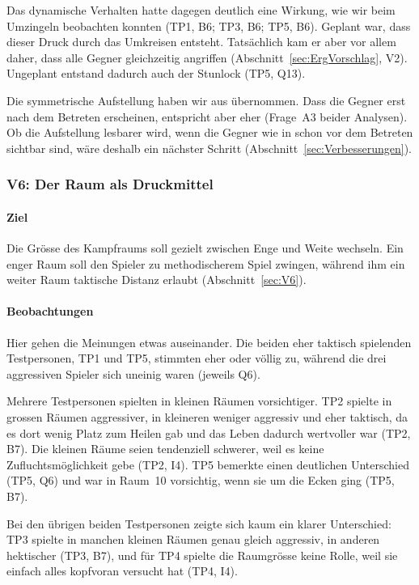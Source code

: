 \documentclass[../Main.tex]{subfiles}
\begin{document}
Das dynamische Verhalten hatte dagegen deutlich eine Wirkung, wie wir beim Umzingeln beobachten konnten (TP1, B6; TP3, B6; TP5, B6). Geplant war, dass dieser Druck durch das Umkreisen entsteht. Tatsächlich kam er aber vor allem daher, dass alle Gegner gleichzeitig angriffen (Abschnitt~\ref{sec:ErgVorschlag}, V2). Ungeplant entstand dadurch auch der Stunlock (TP5, Q13).

Die symmetrische Aufstellung haben wir aus  übernommen. Dass die Gegner erst nach dem Betreten erscheinen, entspricht aber eher  (Frage~A3 beider Analysen). Ob die Aufstellung lesbarer wird, wenn die Gegner wie in  schon vor dem Betreten sichtbar sind, wäre deshalb ein nächster Schritt (Abschnitt~\ref{sec:Verbesserungen}).

\subsubsection{V6: Der Raum als Druckmittel}

\paragraph{Ziel}
Die Grösse des Kampfraums soll gezielt zwischen Enge und Weite wechseln. Ein enger Raum soll den Spieler zu methodischerem Spiel zwingen, während ihm ein weiter Raum taktische Distanz erlaubt (Abschnitt~\ref{sec:V6}).

\paragraph{Beobachtungen}
Hier gehen die Meinungen etwas auseinander. Die beiden eher taktisch spielenden Testpersonen, TP1 und TP5, stimmten eher oder völlig zu, während die drei aggressiven Spieler sich uneinig waren (jeweils Q6).

Mehrere Testpersonen spielten in kleinen Räumen vorsichtiger. TP2 spielte in grossen Räumen aggressiver, in kleineren weniger aggressiv und eher taktisch, da es dort wenig Platz zum Heilen gab und das Leben dadurch wertvoller war (TP2, B7). Die kleinen Räume seien tendenziell schwerer, weil es keine Zufluchtsmöglichkeit gebe (TP2, I4). TP5 bemerkte einen deutlichen Unterschied (TP5, Q6) und war in Raum~10 vorsichtig, wenn sie um die Ecken ging (TP5, B7).

Bei den übrigen beiden Testpersonen zeigte sich kaum ein klarer Unterschied: TP3 spielte in manchen kleinen Räumen genau gleich aggressiv, in anderen hektischer (TP3, B7), und für TP4 spielte die Raumgrösse keine Rolle, weil sie einfach alles kopfvoran versucht hat (TP4, I4).
\end{document}
